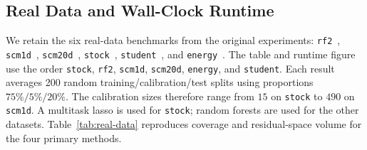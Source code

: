 \subsection{Real Data and Wall-Clock Runtime}
\label{sec:real-data-experiments}

We retain the six real-data benchmarks from the original experiments:
\texttt{rf2}~\citep{grigorios_tsoumakas_eleftherios_spyromitros-xioufis_william_groves_ioannis_vlahavas_2022},
\texttt{scm1d}~\citep{scm1d}, \texttt{scm20d}~\citep{scm20d},
\texttt{stock}~\citep{stock_portfolio_performance_390},
\texttt{student}~\citep{cortez2008student}, and
\texttt{energy}~\citep{tsanas2012energy}. The table and runtime figure use the order
\texttt{stock}, \texttt{rf2}, \texttt{scm1d}, \texttt{scm20d},
\texttt{energy}, and \texttt{student}. Each result averages 200 random
training/calibration/test splits using proportions $75\%/5\%/20\%$. The
calibration sizes therefore range from $15$ on \texttt{stock} to $490$ on
\texttt{scm1d}. A multitask lasso is used for \texttt{stock}; random forests
are used for the other datasets. Table~\ref{tab:real-data} reproduces coverage
and residual-space volume for the four primary methods.

